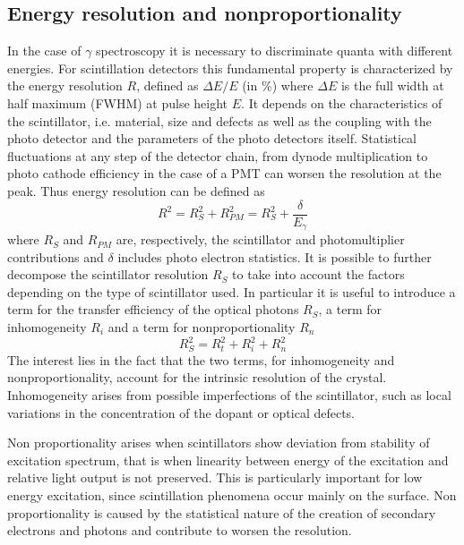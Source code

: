 \subsection{Energy resolution and nonproportionality}
In the case of $\gamma$ spectroscopy it is necessary to discriminate quanta with different energies.
For scintillation detectors this fundamental property is characterized by the energy resolution $R$, defined as $\Delta E/E$ (in $\%$) where $\Delta E$ is the full width at half maximum (FWHM) at pulse height $E$.
It depends on the characteristics of the scintillator, i.e. material, size and defects as well as the coupling with the photo detector and the parameters of the photo detectors itself. Statistical fluctuations at any step of the detector chain, from dynode multiplication to photo cathode efficiency in the case of a PMT can worsen the resolution at the peak. 
Thus energy resolution can be defined as \cite{Rodnyi1997}
\begin{equation}
R^{2} = R_{S}^{2} + R_{PM}^{2} = R_{S}^{2} + \frac{\delta}{E_{\gamma}}
\end{equation}
where $R_{S}$ and $R_{PM}$ are, respectively, the scintillator and photomultiplier contributions and $\delta$ includes photo electron statistics.
It is possible to further decompose the scintillator resolution $R_{S}$ to take into account the factors depending on the type of scintillator used. In particular it is useful to introduce a term for the transfer efficiency of the optical photons $R_{S}$, a term for inhomogeneity $R_{i}$ and a term for nonproportionality $R_{n}$
\begin{equation}
R_{S}^{2} = R_{t}^{2} + R_{i}^{2} + R_{n}^{2}
\end{equation}
The interest lies in the fact that the two terms, for inhomogeneity and nonproportionality, account for the intrinsic resolution of the crystal.
Inhomogeneity arises from possible imperfections of the scintillator, such as local variations in the concentration of the dopant or optical defects.

Non proportionality arises when scintillators show deviation from stability of excitation spectrum, that is when linearity between energy of the excitation and relative light output is not preserved. This is particularly important for low energy excitation, since scintillation phenomena occur mainly on the surface. Non proportionality is caused by the statistical nature of the creation of secondary electrons and photons and contribute to worsen the resolution.

